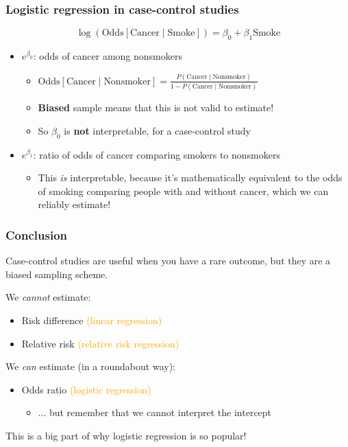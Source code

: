 \documentclass[12pt, 
hyperref={colorlinks=true, linkcolor=blue, urlcolor=cyan}]{beamer}
\begin{document}
\begin{frame}
\frametitle{Logistic regression in case-control studies}
$$\log\left(\text{Odds}[\text{Cancer}\mid \text{Smoke}]\right) = \beta_0 + \beta_1 \text{Smoke}$$

\begin{itemize}
\item $e^{\beta_0}$: odds of cancer among nonsmokers \pause
	\begin{itemize}  
	\item $\text{Odds}[\text{Cancer} \mid \text{Nonsmoker}] = \frac{P(\text{Cancer} \mid \text{Nonsmoker})}{1-P(\text{Cancer} \mid \text{Nonsmoker})}$ \pause
	\item \textbf{Biased} sample means that this is not valid to estimate! 
	\item So $\beta_0$ is \textbf{not} interpretable, for a case-control study \pause
	\end{itemize}
\item $e^{\beta_1}$: ratio of odds of cancer comparing smokers to nonsmokers \pause
	\begin{itemize}
	\item This \textit{is} interpretable, because it's mathematically equivalent to the odds of smoking comparing people with and without cancer, which we can reliably estimate!
	\end{itemize}
\end{itemize}

\end{frame}

\begin{frame}
\frametitle{Conclusion}

Case-control studies are useful when you have a rare outcome, but they are a biased sampling scheme.

We \textit{cannot} estimate:
\begin{itemize}
\item Risk difference \textcolor{orange}{(linear regression)}
\item Relative risk \textcolor{orange}{(relative risk regression)}
\end{itemize}

We \textit{can} estimate (in a roundabout way):
\begin{itemize}
\item Odds ratio \textcolor{orange}{(logistic regression)}
	\begin{itemize}
	\item[] ... but remember that we cannot interpret the intercept
	\end{itemize}
\end{itemize}

This is a big part of why logistic regression is so popular!


\end{frame}
\end{document}
